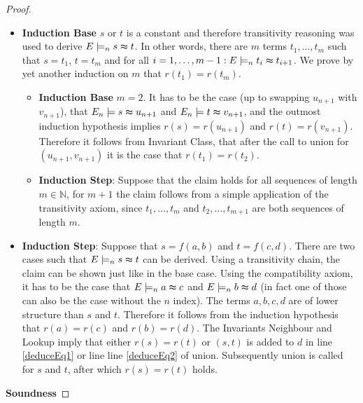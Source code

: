 \begin{proof}
\begin{itemize}
\begin{itemize}
\item \textbf{Induction Base} $s$ or $t$ is a constant and therefore transitivity reasoning was used to derive $E \models_n s \thickapprox t$.
In other words, there are $m$ terms $t_1,\ldots,t_m$ such that $s = t_1$, $t = t_m$ and for all $i = 1,\ldots,m-1: E \models_n t_i \thickapprox t_{i+1}$.
We prove by yet another induction on $m$ that $r(t_1) = r(t_m)$.
\begin{itemize}
\item \textbf{Induction Base} $m = 2$. It has to be the case (up to swapping $u_{n+1}$ with $v_{n+1}$), that $E_n \models s \thickapprox u_{n+1}$ and $E_n \models t \thickapprox v_{n+1}$, and the outmost induction hypothesis implies $r(s) = r(u_{n+1})$ and $r(t) = r(v_{n+1})$.
Therefore it follows from Invariant Class, that after the call to union for $(u_{n+1},v_{n+1})$ it is the case that $r(t_1) = r(t_2)$.

\item \textbf{Induction Step}: Suppose that the claim holds for all sequences of length $m \in \mathbb{N}$, for $m+1$ the claim follows from a simple application of the transitivity axiom, since $t_1,\ldots,t_m$ and $t_2,\ldots,t_{m+1}$ are both sequences of length $m$.
\end{itemize}
\item \textbf{Induction Step}: Suppose that $s = f(a,b)$ and $t = f(c,d)$.
There are two cases such that $E \models_n s \thickapprox t$ can be derived.
Using a transitivity chain, the claim can be shown just like in the base case.
Using the compatibility axiom, it has to be the case that $E \models_n a \thickapprox c$ and $E \models_n b \thickapprox d$ (in fact one of those can also be the case without the $n$ index).
The terms $a,b,c,d$ are of lower structure than $s$ and $t$.
Therefore it follows from the induction hypothesis that $r(a) = r(c)$ and $r(b) = r(d)$.
The Invariants Neighbour and Lookup imply that either $r(s) = r(t)$ or $(s,t)$ is added to $d$ in line \ref{deduceEq1} or line line \ref{deduceEq2} of union.
Subsequently union is called for $s$ and $t$, after which $r(s) = r(t)$ holds.
\end{itemize}
\end{itemize}

\noindent\textbf{Soundness}


\end{proof}
